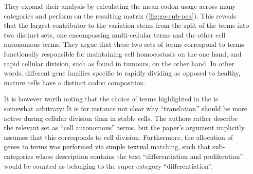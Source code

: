 They expand their analysis by calculating the mean codon usage across many \go
categories and perform \pca on the resulting matrix (\cref{fig:go-cub-pca}).
This reveals that the largest contributor to the variation stems from the split
of the \go terms into two distinct sets, one encompassing multi-cellular \go
terms and the other cell autonomous \go terms. They argue that these two sets of
\go terms correspond to \go terms functionally responsible for maintaining cell
homoeostasis on the one hand, and rapid cellular division, such as found in
tumours, on the other hand. In other words, different gene families specific to
rapidly dividing as opposed to healthy, mature cells have a distinct codon
composition.

It is however worth noting that the choice of \go terms highlighted in the \pca
is somewhat arbitrary: It is for instance not clear why “translation” should be
more active during cellular division than in stable cells. The authors rather
describe the relevant set as “cell autonomous” \go terms, but the paper’s
argument implicitly assumes that this corresponds to cell division. Furthermore,
the allocation of genes to \go terms was performed via simple textual matching,
such that \go sub-categories whose description contains the text
“differentiation and proliferation” would be counted as belonging to the \go
super-category “differentiation”.

